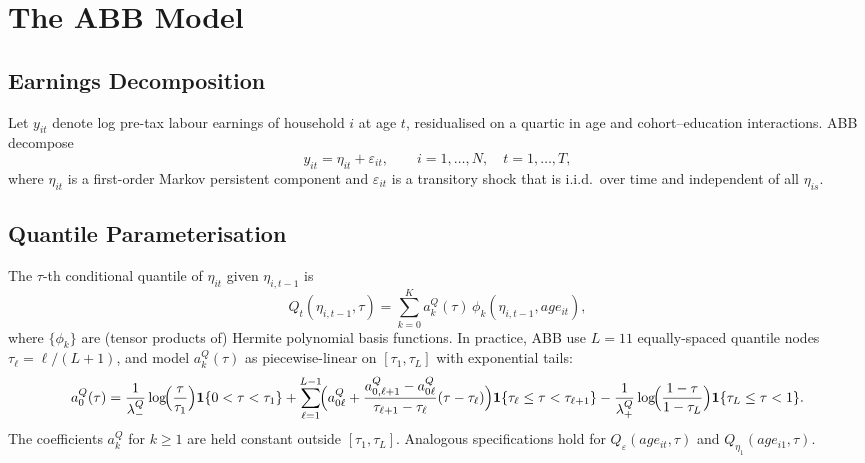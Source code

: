 \documentclass[12pt]{article}
\begin{document}
\section{The ABB Model}
\label{sec:abb}

\subsection{Earnings Decomposition}

Let $y_{it}$ denote log pre-tax labour earnings of household $i$ at age $t$,
residualised on a quartic in age and cohort--education interactions.
ABB decompose
\begin{equation}\label{eq:decomp}
y_{it}=\eta_{it}+\varepsilon_{it},\qquad i=1,\ldots,N,\quad t=1,\ldots,T,
\end{equation}
where $\eta_{it}$ is a first-order Markov persistent component and
$\varepsilon_{it}$ is a transitory shock that is i.i.d.\ over time and
independent of all $\eta_{is}$.

\subsection{Quantile Parameterisation}

The $\tau$-th conditional quantile of $\eta_{it}$ given $\eta_{i,t-1}$ is
\begin{equation}\label{eq:Qt}
Q_t(\eta_{i,t-1},\tau)
=\sum_{k=0}^K a_k^Q(\tau)\,\phi_k(\eta_{i,t-1},age_{it}),
\end{equation}
where $\{\phi_k\}$ are (tensor products of) Hermite polynomial basis
functions.
In practice, ABB use $L=11$ equally-spaced quantile nodes
$\tau_\ell=\ell/(L+1)$, and model $a_k^Q(\tau)$ as piecewise-linear on
$[\tau_1,\tau_L]$ with exponential tails:
\begin{equation}\label{eq:a0Q}
a_0^Q(\tau)=\frac{1}{\lambda_-^Q}\log\!\Bigl(\frac{\tau}{\tau_1}\Bigr)
  \mathbf{1}\{0<\tau<\tau_1\}
  +\sum_{\ell=1}^{L-1}\!\Bigl(a_{0\ell}^Q+\frac{a_{0,\ell+1}^Q-a_{0\ell}^Q}
  {\tau_{\ell+1}-\tau_\ell}(\tau-\tau_\ell)\Bigr)
  \mathbf{1}\{\tau_\ell\le\tau<\tau_{\ell+1}\}
  -\frac{1}{\lambda_+^Q}\log\!\Bigl(\frac{1-\tau}{1-\tau_L}\Bigr)
  \mathbf{1}\{\tau_L\le\tau<1\}.
\end{equation}
The coefficients $a_k^Q$ for $k\ge1$ are held constant outside
$[\tau_1,\tau_L]$.
Analogous specifications hold for $Q_\varepsilon(age_{it},\tau)$ and
$Q_{\eta_1}(age_{i1},\tau)$.
\end{document}
